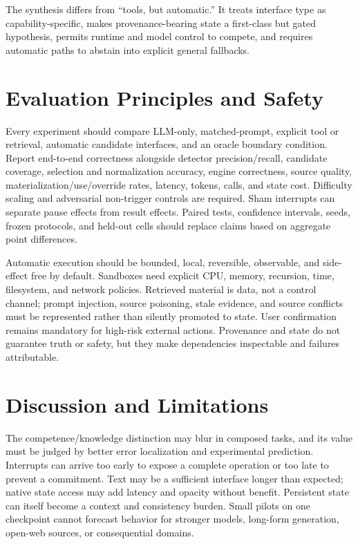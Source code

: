 \documentclass[11pt]{article}
\begin{document}
The synthesis differs from ``tools, but automatic.''  It treats interface type
as capability-specific, makes provenance-bearing state a first-class but gated
hypothesis, permits runtime and model control to compete, and requires automatic
paths to abstain into explicit general fallbacks.

\section{Evaluation Principles and Safety}

Every experiment should compare LLM-only, matched-prompt, explicit tool or
retrieval, automatic candidate interfaces, and an oracle boundary condition.
Report end-to-end correctness alongside detector precision/recall, candidate
coverage, selection and normalization accuracy, engine correctness, source
quality, materialization/use/override rates, latency, tokens, calls, and state
cost.  Difficulty scaling and adversarial non-trigger controls are required.
Sham interrupts can separate pause effects from result effects.  Paired tests,
confidence intervals, seeds, frozen protocols, and held-out cells should replace
claims based on aggregate point differences.

Automatic execution should be bounded, local, reversible, observable, and
side-effect free by default.  Sandboxes need explicit CPU, memory, recursion,
time, filesystem, and network policies.  Retrieved material is data, not a
control channel; prompt injection, source poisoning, stale evidence, and source
conflicts must be represented rather than silently promoted to state.  User
confirmation remains mandatory for high-risk external actions.  Provenance and
state do not guarantee truth or safety, but they make dependencies inspectable
and failures attributable.

\section{Discussion and Limitations}

The competence/knowledge distinction may blur in composed tasks, and its value
must be judged by better error localization and experimental prediction.
Interrupts can arrive too early to expose a complete operation or too late to
prevent a commitment.  Text may be a sufficient interface longer than expected;
native state access may add latency and opacity without benefit.  Persistent
state can itself become a context and consistency burden.  Small pilots on one
checkpoint cannot forecast behavior for stronger models, long-form generation,
open-web sources, or consequential domains.
\end{document}
